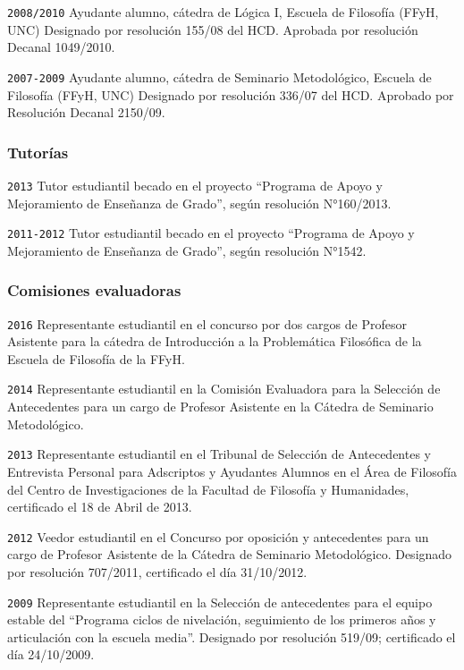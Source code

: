 \documentclass[]{article}
\begin{document}
\texttt{2008/2010} Ayudante alumno, cátedra de Lógica I, Escuela de
Filosofía (FFyH, UNC) Designado por resolución 155/08 del HCD. Aprobada
por resolución Decanal 1049/2010.

\texttt{2007-2009} Ayudante alumno, cátedra de Seminario Metodológico,
Escuela de Filosofía (FFyH, UNC) Designado por resolución 336/07 del
HCD. Aprobado por Resolución Decanal 2150/09.

\hypertarget{tutoruxedas}{%
\subsubsection{Tutorías}\label{tutoruxedas}}

\texttt{2013} Tutor estudiantil becado en el proyecto ``Programa de
Apoyo y Mejoramiento de Enseñanza de Grado'', según resolución
N°160/2013.

\texttt{2011-2012} Tutor estudiantil becado en el proyecto ``Programa de
Apoyo y Mejoramiento de Enseñanza de Grado'', según resolución N°1542.

\hypertarget{comisiones-evaluadoras}{%
\subsubsection{Comisiones evaluadoras}\label{comisiones-evaluadoras}}

\texttt{2016} Representante estudiantil en el concurso por dos cargos de
Profesor Asistente para la cátedra de Introducción a la Problemática
Filosófica de la Escuela de Filosofía de la FFyH.

\texttt{2014} Representante estudiantil en la Comisión Evaluadora para
la Selección de Antecedentes para un cargo de Profesor Asistente en la
Cátedra de Seminario Metodológico.

\texttt{2013} Representante estudiantil en el Tribunal de Selección de
Antecedentes y Entrevista Personal para Adscriptos y Ayudantes Alumnos
en el Área de Filosofía del Centro de Investigaciones de la Facultad de
Filosofía y Humanidades, certificado el 18 de Abril de 2013.

\texttt{2012} Veedor estudiantil en el Concurso por oposición y
antecedentes para un cargo de Profesor Asistente de la Cátedra de
Seminario Metodológico. Designado por resolución 707/2011, certificado
el día 31/10/2012.

\texttt{2009} Representante estudiantil en la Selección de antecedentes
para el equipo estable del ``Programa ciclos de nivelación, seguimiento
de los primeros años y articulación con la escuela media''. Designado
por resolución 519/09; certificado el día 24/10/2009.
\end{document}

